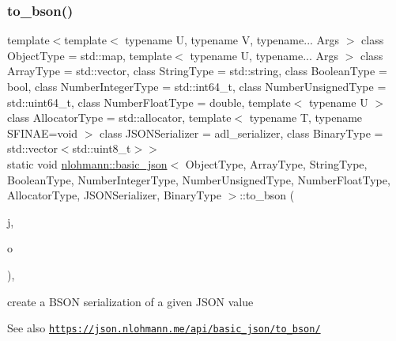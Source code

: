 \subsubsection{\texorpdfstring{to\+\_\+bson()}{to\_bson()}\hspace{0.1cm}{\footnotesize\ttfamily [2/3]}}
{\footnotesize\ttfamily template$<$template$<$ typename U, typename V, typename... Args $>$ class Object\+Type = std\+::map, template$<$ typename U, typename... Args $>$ class Array\+Type = std\+::vector, class String\+Type  = std\+::string, class Boolean\+Type  = bool, class Number\+Integer\+Type  = std\+::int64\+\_\+t, class Number\+Unsigned\+Type  = std\+::uint64\+\_\+t, class Number\+Float\+Type  = double, template$<$ typename U $>$ class Allocator\+Type = std\+::allocator, template$<$ typename T, typename S\+F\+I\+N\+A\+E=void $>$ class J\+S\+O\+N\+Serializer = adl\+\_\+serializer, class Binary\+Type  = std\+::vector$<$std\+::uint8\+\_\+t$>$$>$ \\
static void \hyperlink{classnlohmann_1_1basic__json}{nlohmann\+::basic\+\_\+json}$<$ Object\+Type, Array\+Type, String\+Type, Boolean\+Type, Number\+Integer\+Type, Number\+Unsigned\+Type, Number\+Float\+Type, Allocator\+Type, J\+S\+O\+N\+Serializer, Binary\+Type $>$\+::to\+\_\+bson (\begin{DoxyParamCaption}\item[{const \hyperlink{classnlohmann_1_1basic__json}{basic\+\_\+json}$<$ Object\+Type, Array\+Type, String\+Type, Boolean\+Type, Number\+Integer\+Type, Number\+Unsigned\+Type, Number\+Float\+Type, Allocator\+Type, J\+S\+O\+N\+Serializer, Binary\+Type $>$ \&}]{j,  }\item[{\hyperlink{classnlohmann_1_1detail_1_1output__adapter}{detail\+::output\+\_\+adapter}$<$ std\+::uint8\+\_\+t $>$}]{o }\end{DoxyParamCaption})\hspace{0.3cm}{\ttfamily [inline]}, {\ttfamily [static]}}



create a B\+S\+ON serialization of a given J\+S\+ON value 

\begin{DoxySeeAlso}{See also}
\href{https://json.nlohmann.me/api/basic_json/to_bson/}{\tt https\+://json.\+nlohmann.\+me/api/basic\+\_\+json/to\+\_\+bson/} 
\end{DoxySeeAlso}
\mbox{\label{classnlohmann_1_1basic__json_a9ebed178fb7dad1a574bcb7c361fb1b8}} 

